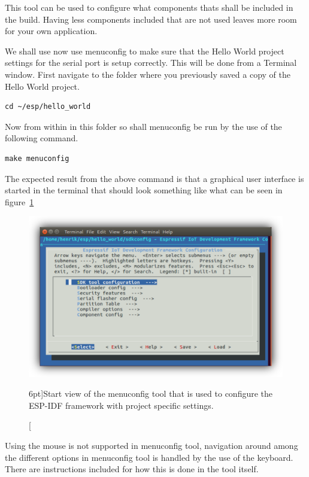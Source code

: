 \documentclass{tufte-book}
\begin{document}
This tool can be used to configure what components thats shall be included in the build. Having less components included that are not used leaves more room for your own application.

We shall use now use menuconfig to make sure that the Hello World project settings for the serial port is setup correctly. This will be done from a Terminal window. First navigate to the folder where you previously saved a copy of the Hello World project.

\begin{lstlisting}
cd ~/esp/hello_world
\end{lstlisting}

Now from within in this folder so shall menuconfig be run by the use of the following command.

\begin{lstlisting}
make menuconfig
\end{lstlisting}

The expected result from the above command is that a graphical user interface is started in the terminal that should look something like what can be seen in figure~\ref{fig:menuconfig_shadowed}

\begin{figure}
	\includegraphics{menuconfig_shadowed.png}
	\caption[ $n$.][6pt]{Start view of the menuconfig tool that is used to configure the ESP-IDF framework with project specific settings.}
	\label{fig:menuconfig_shadowed}
\end{figure}

Using the mouse is not supported in menuconfig tool, navigation around among the different options in menuconfig tool is handled by the use of the keyboard. There are instructions included for how this is done in the tool itself.
\end{document}
